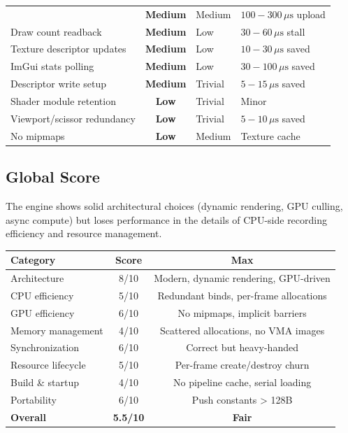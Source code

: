 \documentclass[a4paper,10pt]{article}
\newcommand{\us}{\ensuremath{\,\mu\text{s}}}
\newcommand{\severity}[1]{%
  \ifstrequal{#1}{Critical}{\textcolor{critical}{\textbf{#1}}}{%
  \ifstrequal{#1}{High}{\textcolor{high}{\textbf{#1}}}{%
  \ifstrequal{#1}{Medium}{\textcolor{medium}{\textbf{#1}}}{%
  \ifstrequal{#1}{Low}{\textcolor{low}{\textbf{#1}}}{#1}}}}}
\begin{document}
\begin{longtable}{p{}cp{}p{}}
        & \severity{Medium}
        & Medium
        & $100{-}300\us$ upload \\
    Draw count readback
        & \severity{Medium}
        & Low
        & $30{-}60\us$ stall \\
    Texture descriptor updates
        & \severity{Medium}
        & Low
        & $10{-}30\us$ saved \\
    ImGui stats polling
        & \severity{Medium}
        & Low
        & $30{-}100\us$ saved \\
    Descriptor write setup
        & \severity{Medium}
        & Trivial
        & $5{-}15\us$ saved \\
    Shader module retention
        & \severity{Low}
        & Trivial
        & Minor \\
    Viewport/scissor redundancy
        & \severity{Low}
        & Trivial
        & $5{-}10\us$ saved \\
    No mipmaps
        & \severity{Low}
        & Medium
        & Texture cache \\
\hline
\end{longtable}

\subsection{Global Score}

The engine shows solid architectural choices (dynamic rendering, GPU culling,
async compute) but loses performance in the details of CPU-side recording
efficiency and resource management.

\begin{center}
\begin{tabular}{lcc}
\toprule
\textbf{Category} & \textbf{Score} & \textbf{Max} \\
\midrule
Architecture & 8/10 & Modern, dynamic rendering, GPU-driven \\
CPU efficiency & 5/10 & Redundant binds, per-frame allocations \\
GPU efficiency & 6/10 & No mipmaps, implicit barriers \\
Memory management & 4/10 & Scattered allocations, no VMA images \\
Synchronization & 6/10 & Correct but heavy-handed \\
Resource lifecycle & 5/10 & Per-frame create/destroy churn \\
Build \& startup & 4/10 & No pipeline cache, serial loading \\
Portability & 6/10 & Push constants > 128B \\
\midrule
\textbf{Overall} & \textbf{5.5/10} & \textbf{Fair} \\
\bottomrule
\end{tabular}
\end{center}
\end{document}
